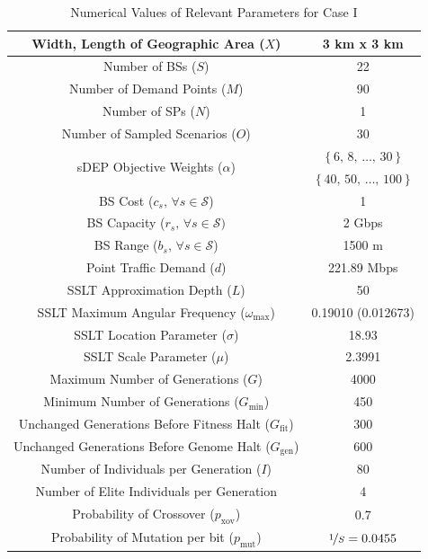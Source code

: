 \documentclass[12pt,dvipsnames]{report}
\begin{document}
\begin{table}[!htp]
	\centering
	\caption{Numerical Values of Relevant Parameters for Case I}
	\begin{tabular}{|c|c|} 
	\hline
		Width, Length of Geographic Area ($X$) & 3 km x 3 km \\
		\hline
		Number of BSs ($S$) & 22 \\ 
		\hline 
		Number of Demand Points ($M$) & 90 \\ 
		\hline 
		Number of SPs ($N$) & 1 \\
		\hline
		Number of Sampled Scenarios ($O$) & 30 \\ 
		\hline 
		\multirow{2}{*}{sDEP Objective Weights ($\alpha$)} & $\left\{ 6,\, 8,\, \ldots,\, 30 \right\}$ \\
		& $\left\{ 40,\, 50,\, \ldots,\, 100 \right\}$ \\
		\hline
		BS Cost ($c_s,\, \forall s \in \mathcal{S}$) & 1 \\ 
		\hline 
		BS Capacity ($r_s,\, \forall s \in \mathcal{S})$ & 2 Gbps \\ 
		\hline
		BS Range ($b_s,\, \forall s \in \mathcal{S}$) & 1500 m \\
		\hline 
		Point Traffic Demand ($d$) & 221.89 Mbps \\ 
		\hline 
		\hline
		SSLT Approximation Depth ($L$) & 50 \\ 
		\hline
		SSLT Maximum Angular Frequency ($\omega_{\max}$) & 0.19010 (0.012673) \\
		\hline 
		SSLT Location Parameter ($\sigma$) & 18.93 \\ 
		\hline 
		SSLT Scale Parameter ($\mu$) & 2.3991 \\ 
		\hline 
		\hline
		Maximum Number of Generations ($G$) & 4000 \\ 
		\hline
		Minimum Number of Generations ($G_{\min}$) & 450 \\
		\hline
		Unchanged Generations Before Fitness Halt ($G_{\text{fit}}$) & 300 \\
		\hline 
		Unchanged Generations Before Genome Halt ($G_{\text{gen}}$) & 600 \\
		\hline 
		Number of Individuals per Generation ($I$) & 80 \\ 
		\hline
		Number of Elite Individuals per Generation & 4 \\
		\hline 
		Probability of Crossover ($p_\text{xov}$) & 0.7 \\ 
		\hline
		Probability of Mutation per bit ($p_\text{mut}$) & $\nicefrac{1}{S} = 0.0455$ \\

\end{tabular}
\end{table}
\end{document}
